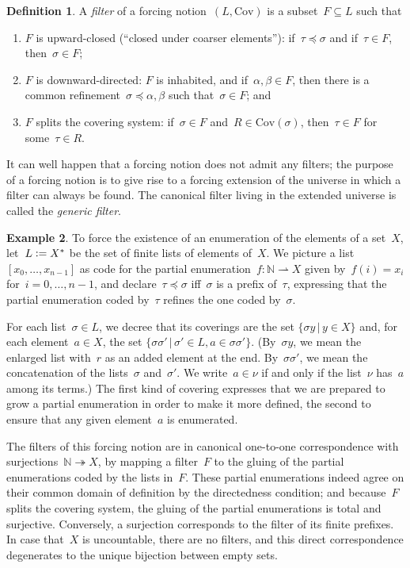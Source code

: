 \documentclass[com,11pt,crcready]{iosart2x}
\theoremstyle{definition}
\newtheorem{definition}{Definition}[section]
\newtheorem{example}[definition]{Example}
\theoremstyle{plain}
\theoremstyle{remark}
\newcommand{\?}{\,{:}\,}
\newcommand{\NN}{\mathbb{N}}
\newcommand{\defeq}{\vcentcolon=}
\newcommand{\Cov}{\mathrm{Cov}}
\renewcommand{\_}{\mathpunct{.}\,}
\begin{document}
\begin{definition}A \emph{filter} of a forcing notion~$(L,\mathrm{Cov})$
is a subset~$F \subseteq L$ such that
\begin{enumerate}
\item $F$ is upward-closed (``closed under coarser elements''): if~$\tau \preceq \sigma$ and if~$\tau \in F$,
then~$\sigma \in F$;
\item $F$ is downward-directed: $F$ is inhabited, and if~$\alpha,\beta \in F$,
then there is a common refinement~$\sigma \preceq \alpha,\beta$ such
that~$\sigma \in F$; and
\item $F$ splits the covering system: if~$\sigma \in F$ and~$R \in
\Cov(\sigma)$, then~$\tau \in F$ for some~$\tau \in R$.
\end{enumerate}
\end{definition}

It can well happen that a forcing notion does not admit any filters; the
purpose of a forcing notion is to give rise to a forcing extension of the
universe in which a filter can always be found. The canonical filter living in
the extended universe is called the \emph{generic filter}.

\begin{example}\label{ex:notion-enum}To force the existence of an enumeration
of the elements of a set~$X$, let~$L \defeq X^*$ be the set of finite lists
of elements of~$X$. We picture a list~$[x_0,\ldots,x_{n-1}]$ as code for the
partial enumeration~$f : \NN \rightharpoonup X$ given by~$f(i) = x_i$
for~$i=0,\ldots,n-1$, and declare~$\tau \preceq \sigma$ iff~$\sigma$ is a prefix
of~$\tau$, expressing that the partial enumeration coded by~$\tau$ refines the
one coded by~$\sigma$.

For each list~$\sigma \in L$, we decree that its coverings are the set
$\{ \sigma y \,|\, y \in X \}$
and, for each element~$a \in X$, the set
$\{ \sigma \sigma' \,|\, \sigma' \in L, a \in \sigma \sigma'
\}$. (By~$\sigma y$, we mean the enlarged list with~$r$ as an
added element at the end. By~$\sigma \sigma'$, we mean the concatenation
of the lists~$\sigma$ and~$\sigma'$. We write~$a \in \nu$ if and only if the
list~$\nu$ has~$a$ among its terms.)
The first kind of covering expresses that we are prepared to grow a partial
enumeration in order to make it more defined, the second to ensure
that any given element~$a$ is enumerated.

The filters of this forcing notion
are in canonical one-to-one correspondence with
surjections~$\NN \twoheadrightarrow X$, by mapping a filter~$F$ to the gluing
of the partial enumerations coded by the lists in~$F$. These partial
enumerations indeed agree on their common domain of definition by the
directedness condition; and because~$F$ splits the covering system, the gluing
of the partial enumerations is total and surjective. Conversely, a surjection corresponds to the filter of
its finite prefixes. In case that~$X$ is uncountable, there are no filters, and
this direct correspondence degenerates to the unique bijection between
empty sets.
\end{example}
\end{document}
